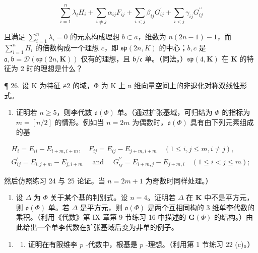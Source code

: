 \[
\sum_ {i = 1} ^ {n} \lambda_ {i} H _ {i} + \sum_ {i \neq j} \alpha_ {i j} F _ {i j} + \sum_ {i <   j} \beta_ {i j} G _ {i j} ^ {\prime} + \sum_ {i <   j} \gamma_ {i j} G _ {i j} ^ {\prime \prime}
\]

且满足 \(\sum_{i=1}^{n} \lambda_i = 0\) 的元素构成理想 \(b \subset a\)，维数为 \(n(2n - 1) - 1\)，而 \(\sum_{i=1}^{n} H_i\) 的倍数构成一个理想 \(c\)，即 \(\mathfrak{sp}(2n, K)\) 的中心；\(b, c\) 是 \(\mathfrak{a},\mathfrak{b} = \mathcal{D}(\mathfrak{sp}(2n,\mathbf{K}))\) 仅有的理想，且 \(\mathfrak{b} / \mathfrak{c}\) 单。（同法。）\(\mathfrak{sp}(4,\mathbf{K})\) 在 \(\mathbf{K}\) 的特征为 2 时的理想是什么？

¶ 26. 设 K 为特征 ≠2 的域，Φ 为 K 上 n 维向量空间上的非退化对称双线性形式。

\begin{enumerate}
\def\labelenumi{(\alph{enumi})}
\tightlist
\item
  证明若 \(n \geqslant 5\)，则李代数 \(\mathfrak{o}(\Phi)\) 单。（通过扩张基域，可归结为 \(\Phi\) 的指标为 \(m = [n/2]\) 的情形。例如当 \(n = 2m\) 为偶数时，\(\mathfrak{o}(\Phi)\) 具有由下列元素组成的基
\end{enumerate}

\[
\begin{array}{c} H _ {i} = E _ {i i} - E _ {i + m, i + m}, \quad F _ {i j} = E _ {i j} - E _ {j + m, i + m} \quad (1 \leqslant i, j \leqslant m, i \neq j), \\ G _ {i j} ^ {\prime} = E _ {i, j + m} - E _ {j, i + m} \quad \text { and } \quad G _ {i j} ^ {\prime \prime} = E _ {i + m, j} - E _ {j + m, i} \quad (1 \leqslant i <   j \leqslant m); \end{array}
\]

然后仿照练习 24 与 25 论证。当 \(n = 2m + 1\) 为奇数时同样处理。）

\begin{enumerate}
\def\labelenumi{(\alph{enumi})}
\setcounter{enumi}{1}
\tightlist
\item
  设 \(\Delta\) 为 \(\Phi\) 关于某个基的判别式。设 \(n = 4\)。证明若 \(\Delta\) 在 \(\mathbf{K}\) 中不是平方元，则 \(\mathfrak{o}(\Phi)\) 单。若 \(\Delta\) 是平方元，则 \(\mathfrak{o}(\Phi)\) 是两个互相同构的 3 维单李代数的乘积。（利用《代数》第 IX 章第 9 节练习 16 中描述的 \(\mathbf{G}(\Phi)\) 的结构。）由此给出一个单李代数在扩张基域后变为非单的例子。
\end{enumerate}

\begin{enumerate}
\def\labelenumi{\arabic{enumi}.}
\setcounter{enumi}{26}
\tightlist
\item
  \begin{enumerate}
  \def\labelenumii{(\alph{enumii})}
  \tightlist
  \item
    证明在有限维李 \(p\) -代数中，根基是 \(p\) -理想。（利用第 1 节练习 22 (c)。）
  \end{enumerate}
\end{enumerate}

